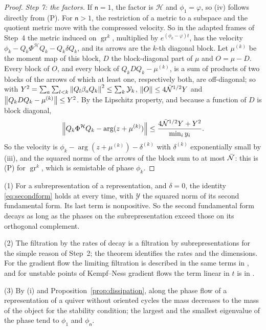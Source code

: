 \begin{proof}
\emph{Step 7: the factors.} If $\mathsf n=1$, the factor is $\mathcal H$
and $\phi_1=\varphi$, so (iv) follows directly from (P). For $\mathsf n>1$,
the restriction of a metric to a subspace and
the quotient metric move with the compressed velocity. So in the adapted
frames of Step~4 the metric induced on $\operatorname{gr}^k$, multiplied by
$e^{(\phi_k-\varphi)t}$, has the velocity
$\phi_k-Q_k\Phi^{\mathcal H}Q_k-Q_k\delta Q_k$, and its arrows are the $k$-th
diagonal block. Let $\mu^{(k)}$ be the moment map of this block, $D$ the
block-diagonal part of $\mu$ and $O=\mu-D$. Every block of $O$, and every
block of $Q_kDQ_k-\mu^{(k)}$, is a sum of products of two blocks of the
arrows of which at least one, respectively both, are off-diagonal; so with
$Y^2=\sum_a\sum_{l<k}\left\lVert Q_l\beta_aQ_k\right\rVert^2\leq\sum_k\mathcal Y_k$,
$\left\lVert O\right\rVert\leq4\bar{\mathcal N}^{1/2}Y$ and $\left\lVert Q_kDQ_k-\mu^{(k)}\right\rVert\leq Y^2$. By the
Lipschitz property, and because a function of $D$ is block diagonal,
\[
 \left\lVert Q_k\Phi^{\mathcal H}Q_k-\arg(z+\mu^{(k)})\right\rVert\leq\frac{4\bar{\mathcal N}^{1/2}Y+Y^2}{\min_iy_i}.
\]
So the velocity is $\phi_k-\arg(z+\mu^{(k)})-\delta^{(k)}$ with
$\delta^{(k)}$ exponentially small by (iii), and the squared norms of the
arrows of the block sum to at most $\bar{\mathcal N}$: this is (P) for
$\operatorname{gr}^k$, which is semistable of phase $\phi_k$.
\end{proof}

\begin{remark}\label{rem:hn}
(1) For a subrepresentation of a representation, and $\delta=0$, the
identity \eqref{eq:secondform} holds at every time, with $\mathcal Y$ the
squared norm of its second fundamental form. Its last term is nonpositive.
So the second fundamental form decays as long as the phases on the
subrepresentation exceed those on its orthogonal complement.

(2) The filtration by the rates of decay is a filtration by
subrepresentations for the simple reason of Step~2; the theorem identifies
the rates and the dimensions. For the gradient flow the limiting filtration
is described in the same terms in \cite[\S1.1]{hkkp23}, and for unstable
points of Kempf--Ness gradient flows the term linear in $t$ is in
\cite{lam26}.

(3) By (i) and Proposition~\ref{prop:dissipation}, along the phase flow of a
representation of a quiver without oriented cycles the mass decreases to the
mass of the object for the stability condition; the largest and the
smallest eigenvalue of the phase tend to $\phi_1$ and $\phi_{\mathsf n}$.
\end{remark}
